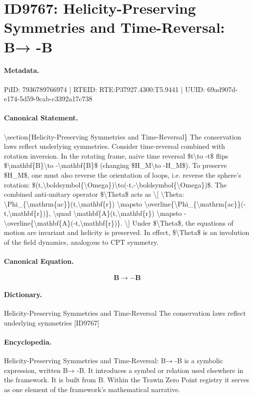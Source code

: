 \section*{ID9767: Helicity-Preserving Symmetries and Time-Reversal: B→ -B}
\paragraph{Metadata.}
PiID: 7936789766974 | RTEID: RTE:P37927.4300:T5.9441 | UUID: 69ad907d-e174-5d59-9cab-c3392a17c738

\paragraph{Canonical Statement.}
\textbackslash{}section\{Helicity-Preserving Symmetries and Time-Reversal\} The conservation laws reflect underlying symmetries. Consider time-reversal combined with rotation inversion. In the rotating frame, naive time reversal \$t\textbackslash{}to -t\$ flips \$\textbackslash{}mathbf\{B\}\textbackslash{}to -\textbackslash{}mathbf\{B\}\$ (changing \$H\_M\textbackslash{}to -H\_M\$). To preserve \$H\_M\$, one must also reverse the orientation of loops, i.e. reverse the sphere's rotation: \$(t,\textbackslash{}boldsymbol\{\textbackslash{}Omega\})\textbackslash{}to(-t,-\textbackslash{}boldsymbol\{\textbackslash{}Omega\})\$. The combined anti-unitary operator \$\textbackslash{}Theta\$ acts as \textbackslash{}[ \textbackslash{}Theta: \textbackslash{}Phi\_\{\textbackslash{}mathrm\{ac\}\}(t,\textbackslash{}mathbf\{r\}) \textbackslash{}mapsto \textbackslash{}overline\{\textbackslash{}Phi\_\{\textbackslash{}mathrm\{ac\}\}(-t,\textbackslash{}mathbf\{r\})\}, \textbackslash{}quad \textbackslash{}mathbf\{A\}(t,\textbackslash{}mathbf\{r\}) \textbackslash{}mapsto -\textbackslash{}overline\{\textbackslash{}mathbf\{A\}(-t,\textbackslash{}mathbf\{r\})\}. \textbackslash{}] Under \$\textbackslash{}Theta\$, the equations of motion are invariant and helicity is preserved. In effect, \$\textbackslash{}Theta\$ is an involution of the field dynamics, analogous to CPT symmetry.

\paragraph{Canonical Equation.}
\[
\mathbf{B}\to -\mathbf{B}
\]

\paragraph{Dictionary.}
Helicity-Preserving Symmetries and Time-Reversal The conservation laws reflect underlying symmetries [ID9767]

\paragraph{Encyclopedia.}
Helicity-Preserving Symmetries and Time-Reversal: B→ -B is a symbolic expression, written B→ -B. It introduces a symbol or relation used elsewhere in the framework. It is built from B. Within the Trawin Zero Point registry it serves as one element of the framework's mathematical narrative.
